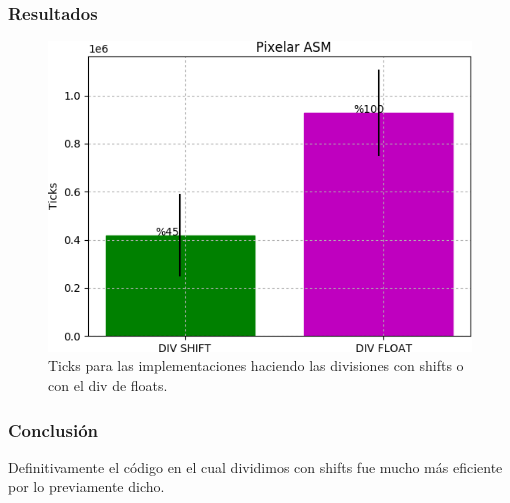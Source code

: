 \subsubsection{Resultados}
\begin{figure}[H]
	\centering
	\captionsetup{justification=centering}
	\includegraphics[width = 11 cm, height = 6.5 cm]{imagenes/Div_pixelar.png}
	\caption[center]{Ticks para las implementaciones haciendo las divisiones con shifts o con el div de floats.}
\end{figure}
	
\subsubsection{Conclusión}
\par{Definitivamente el código en el cual dividimos con shifts fue mucho más eficiente por lo previamente dicho.}